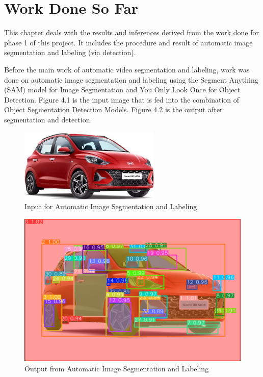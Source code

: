 
\section{Work Done So Far}



This chapter deals with the results and inferences derived from the work done for phase 1 of this project. It includes the procedure and result of automatic image segmentation and labeling (via detection).

\noindent
Before the main work of automatic video segmentation and labeling, work was done on automatic image segmentation and labeling using the Segment Anything (SAM) model for Image Segmentation and You Only Look Once for Object Detection. Figure 4.1 is the input image that is fed into the combination of Object Segmentation Detection Models. Figure 4.2 is the output after segmentation and detection.

\begin{figure}[h]
    \centering
    \includegraphics[width=0.6\textwidth]{Images/car.jpg}
    \caption{Input for Automatic Image Segmentation and Labeling}
\end{figure}

\clearpage

\begin{figure}[h]
    \centering
    \includegraphics[width=.7\textwidth]{Images/car_sam_yolo.png}
    \caption{Output from Automatic Image Segmentation and Labeling}
\end{figure}

